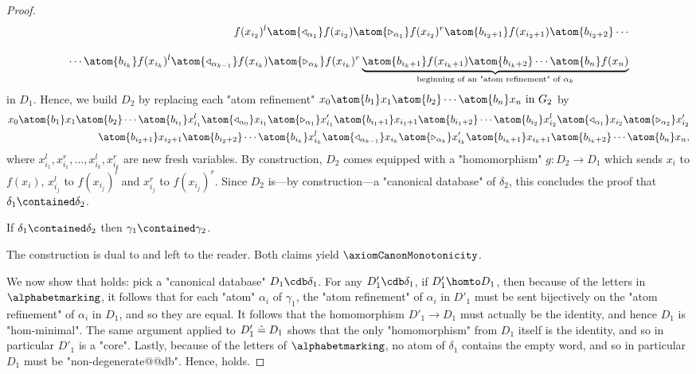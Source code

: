\begin{proof}
\begin{align*}
{		}
		f(x_{i_2})^l 
		\atom{\triangleleft_{\alpha_{1}}} f(x_{i_2}) \atom{\triangleright_{\alpha_{1}}} f(x_{i_2})^r 
		\atom{b_{i_2+1}} f(x_{i_{2}+1}) \atom{b_{i_2+2}} \cdots
		\\[1em] 
		\cdots \atom{b_{i_k}}
		f(x_{i_k})^l \atom{\triangleleft_{\alpha_{k-1}}} f(x_{i_k}) \atom{\triangleright_{\alpha_{k}}} f(x_{i_k})^r
		\underbrace{\atom{b_{i_k+1}} f(x_{i_{k}+1}) \atom{b_{i_k+2}} \cdots \atom{b_n} f(x_n)}_{
			\text{beginning of an "atom refinement" of $\alpha_k$}
		}
	\end{align*}
	in $D_1$. Hence, we build $D_2$ by replacing each "atom refinement"
	$
		x_0 \atom{b_1} x_1 \atom{b_2} \cdots \atom{b_n} x_n
		\text{ in } G_2
	$
	by
	\begin{align*}
		x_0 \atom{b_1} x_1 \atom{b_2} \cdots \atom{b_{i_1}}
		x_{i_1}^l \atom{\triangleleft_{\alpha_0}} x_{i_1} \atom{\triangleright_{\alpha_{1}}} x_{i_1}'
		\atom{b_{i_1+1}} x_{i_{1}+1} \atom{b_{i_1+2}} \cdots \atom{b_{i_2}}
		x_{i_2}^l \atom{\triangleleft_{\alpha_1}} x_{i_2} \atom{\triangleright_{\alpha_{2}}} x_{i_2}'\\
		\atom{b_{i_2+1}} x_{i_{2}+1} \atom{b_{i_2+2}} \cdots \atom{b_{i_k}}
		x_{i_k}^l \atom{\triangleleft_{\alpha_{k-1}}} x_{i_k} \atom{\triangleright_{\alpha_{k}}} x_{i_k}'
		\atom{b_{i_k+1}} x_{i_{k}+1} \atom{b_{i_k+2}} \cdots \atom{b_n} x_n,
	\end{align*}
	where $x_{i_1}^l, x_{i_1}^r, \hdots, x_{i_k}^l, x_{i_k}^r$ are new fresh variables.
	By construction, $D_2$ comes equipped with a "homomorphism" 
	$g\colon D_2 \to D_1$ which sends $x_i$ to $f(x_i)$,
	$x_{i_j}^l$ to $f(x_{i_j})^l$ and $x_{i_j}^r$ to $f(x_{i_j})^r$. Since $D_2$ is---by
	construction---a "canonical database" of $\delta_2$, this concludes the proof that 
	$\delta_1 \contained \delta_2$.

	\begin{claim}
		\AP\label{claim:canonization-multigraph-monotonic-r-to-l}
		If $\delta_1 \contained \delta_2$ then $\gamma_1 \contained \gamma_2$.
	\end{claim}

	The construction is dual to  and left to the
	reader. Both claims yield $\axiomCanonMonotonicity$.

	We now show that \axiomStrongCanonCore{} holds: pick a "canonical database" $D_1 \cdb \delta_1$.
	For any $D'_1 \cdb \delta_1$, if $D'_1 \homto D_1$, then because of the letters in $\alphabetmarking$,
	it follows that for each "atom" $\alpha_i$ of $\gamma_1$, the "atom refinement" of
	$\alpha_i$ in $D'_1$ must be sent bijectively on the "atom refinement" of $\alpha_i$ in $D_1$,
	and so they are equal. It follows that the homomorphism $D'_1 \to D_1$ must actually be the identity,
	and hence $D_1$ is "hom-minimal".
	The same argument applied to $D'_1 \mathrel{\hat{=}} D_1$ shows that the only "homomorphism" from $D_1$ itself
	is the identity, and so in particular $D'_1$ is a "core".
	Lastly, because of the letters of $\alphabetmarking$, no atom of $\delta_1$ contains the empty word,
	and so in particular $D_1$ must be "non-degenerate@@db". Hence, \axiomStrongCanonCore{} holds.


\end{proof}
